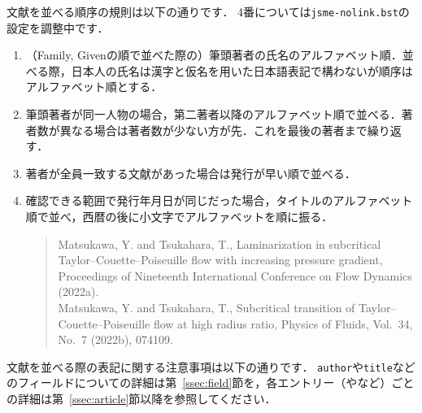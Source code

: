 \documentclass[a4paper,fleqn,uplatex,dvipdfmx]{jsarticle}
\newcommand{\jsmefile}{\texttt{jsme-nolink.bst}}
\begin{document}
文献を並べる順序の規則は以下の通りです．
4番については\jsmefile の設定を調整中です．
\begin{itembox}[l]{}
    \begin{enumerate}
        \item （Family, Givenの順で並べた際の）筆頭著者の氏名のアルファベット順．並べる際，日本人の氏名は漢字と仮名を用いた日本語表記で構わないが順序はアルファベット順とする．
        \item 筆頭著者が同一人物の場合，第二著者以降のアルファベット順で並べる．著者数が異なる場合は著者数が少ない方が先．これを最後の著者まで繰り返す．
        \item 著者が全員一致する文献があった場合は発行が早い順で並べる．
        \item 確認できる範囲で発行年月日が同じだった場合，タイトルのアルファベット順で並べ，西暦の後に小文字でアルファベットを順に振る．
        \begin{quote}
            Matsukawa, Y. and Tsukahara, T., Laminarization in subcritical Taylor--Couette--Poiseuille flow with increasing pressure gradient, Proceedings of Nineteenth International Conference on Flow Dynamics (2022a). \\
            Matsukawa, Y. and Tsukahara, T., Subcritical transition of Taylor--Couette--Poiseuille flow at high radius ratio, Physics of Fluids, Vol.~34, No.~7 (2022b), 074109.
        \end{quote}
    \end{enumerate}
\end{itembox}
文献を並べる際の表記に関する注意事項は以下の通りです．
\verb|author|や\verb|title|などのフィールドについての詳細は第~\ref{ssec:field}節を，各エントリー（\ttarticle や\ttbook など）ごとの詳細は第~\ref{ssec:article}節以降を参照してください．
\renewcommand\UrlFont{\rmfamily}
\end{document}
